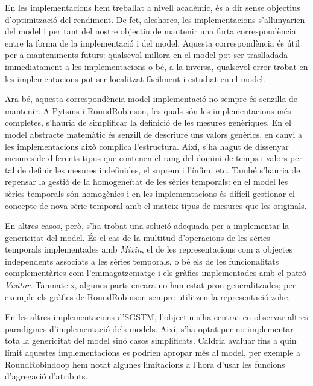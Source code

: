 En les implementacions hem treballat a nivell acadèmic, és a dir sense
objectius d'optimització del rendiment. De fet, aleshores, les
implementacions s'allunyarien del model i per tant del nostre objectiu
de mantenir una forta correspondència entre la forma de la
implementació i del model. Aquesta correspondència és útil per a
manteniments futurs: qualsevol millora en el model pot ser
traslladada immediatament a les implementacions o bé, a la inversa,
qualsevol error trobat en les implementacions pot ser localitzat
fàcilment i estudiat en el model.





Ara bé, aquesta correspondència model-implementació no sempre és
senzilla de mantenir. A Pytsms i RoundRobinson, les quals són les
implementacions més completes, s'hauria de simplificar la definició de
les mesures genèriques.  En el model abstracte matemàtic és senzill de
descriure uns valors genèrics, en canvi a les implementacions això
complica l'estructura. Així, s'ha hagut de dissenyar mesures de
diferents tipus que contenen el rang del domini de temps i valors per
tal de definir les mesures indefinides, el suprem i l'ínfim, etc.
També s'hauria de repensar la gestió de la homogeneïtat de les sèries
temporals: en el model les sèries temporals són homogènies i en les
implementacions és difícil gestionar el concepte de nova sèrie
temporal amb el mateix tipus de mesures que les originals.

En altres casos, però, s'ha trobat una solució adequada per a
implementar la genericitat del model.  És el cas de la
multitud d'operacions de les sèries temporals implementades amb
\emph{Mixin}, el de les representacions com a objectes independents
associats a les sèries temporals, o bé els de les funcionalitats
complementàries com l'emmagatzematge i els gràfics implementades amb
el patró \emph{Visitor}. Tanmateix, algunes parts encara no han estat prou
generalitzades; per exemple els gràfics de RoundRobinson sempre
utilitzen la representació \gls{zohe}.





En les altres implementacions d'\gls{SGSTM}, l'objectiu s'ha centrat
en observar altres paradigmes d'implementació dels models. Així, s'ha
optat per no implementar tota la genericitat del model sinó casos
simplificats. Caldria avaluar fins a quin límit aquestes
implementacions es podrien apropar més al model, per exemple a
RoundRobindoop hem notat algunes limitacions a l'hora d'usar les
funcions d'agregació d'atributs.


